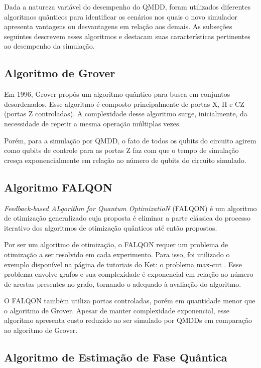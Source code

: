 Dada a natureza variável do desempenho do QMDD, foram utilizados diferentes algoritmos quânticos para identificar os cenários nos quais o novo simulador apresenta vantagens ou desvantagens em relação aos demais. As subseções seguintes descrevem esses algoritmos e destacam suas características pertinentes ao desempenho da simulação.

\subsection{Algoritmo de Grover}\label{sub:grover}

Em 1996, Grover propôs um algoritmo quântico para busca em conjuntos desordenados. Esse algoritmo é composto principalmente de portas X, H e CZ (portas Z controladas). A complexidade desse algoritmo surge, inicialmente, da necessidade de repetir a mesma operação múltiplas vezes. \cite{grover}

Porém, para a simulação por QMDD, o fato de todos os qubits do circuito agirem como qubits de controle para as portas Z faz com que o tempo de simulação cresça exponencialmente em relação ao número de qubits do circuito simulado.

\subsection{Algoritmo FALQON}\label{sub:falqon}

{\itshape Feedback-based ALgorithm for Quantum OptimizatioN} (FALQON) é um algoritmo de otimização generalizado cuja proposta é eliminar a parte clássica do processo iterativo dos algoritmos de otimização quânticos até então propostos. \cite{magann2022falqon}

Por ser um algoritmo de otimização, o FALQON requer um problema de otimização a ser resolvido em cada experimento. Para isso, foi utilizado o exemplo disponível na página de tutoriais do Ket: o problema max-cut \cite{ket2021falqon}. Esse problema envolve grafos e sua complexidade é exponencial em relação ao número de arestas presentes no grafo, tornando-o adequado à avaliação do algoritmo.

O FALQON também utiliza portas controladas, porém em quantidade menor que o algoritmo de Grover. Apesar de manter complexidade exponencial, esse algoritmo apresenta custo reduzido ao ser simulado por QMDDs em comparação ao algoritmo de Grover.

\subsection{Algoritmo de Estimação de Fase Quântica}\label{sub:qpe}

